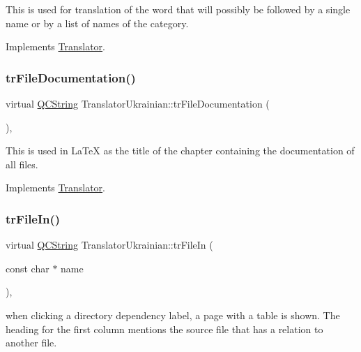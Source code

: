 This is used for translation of the word that will possibly be followed by a single name or by a list of names of the category. 

Implements \mbox{\hyperlink{class_translator}{Translator}}.

\mbox{\label{class_translator_ukrainian_aac3fe698494515dcabb4080cc5e07733}} 
\subsubsection{\texorpdfstring{trFileDocumentation()}{trFileDocumentation()}}
{\footnotesize\ttfamily virtual \mbox{\hyperlink{class_q_c_string}{Q\+C\+String}} Translator\+Ukrainian\+::tr\+File\+Documentation (\begin{DoxyParamCaption}{ }\end{DoxyParamCaption})\hspace{0.3cm}{\ttfamily [inline]}, {\ttfamily [virtual]}}

This is used in La\+TeX as the title of the chapter containing the documentation of all files. 

Implements \mbox{\hyperlink{class_translator}{Translator}}.

\mbox{\label{class_translator_ukrainian_a6024d2be123fdc404656eef40d221acf}} 
\subsubsection{\texorpdfstring{trFileIn()}{trFileIn()}}
{\footnotesize\ttfamily virtual \mbox{\hyperlink{class_q_c_string}{Q\+C\+String}} Translator\+Ukrainian\+::tr\+File\+In (\begin{DoxyParamCaption}\item[{const char $\ast$}]{name }\end{DoxyParamCaption})\hspace{0.3cm}{\ttfamily [inline]}, {\ttfamily [virtual]}}

when clicking a directory dependency label, a page with a table is shown. The heading for the first column mentions the source file that has a relation to another file. 

